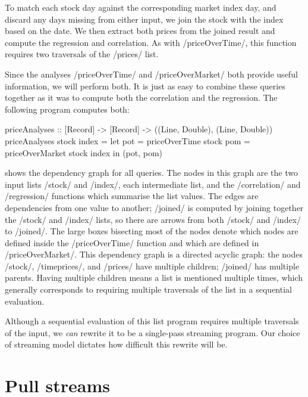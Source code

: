 To match each stock day against the corresponding market index day, and discard any days missing from either input, we join the stock with the index based on the date.
We then extract both prices from the joined result and compute the regression and correlation.
As with \Hs/priceOverTime/, this function requires two traversals of the \Hs/prices/ list.

Since the analyses \Hs/priceOverTime/ and \Hs/priceOverMarket/ both provide useful information, we will perform both.
It is just as easy to combine these queries together as it was to compute both the correlation and the regression.
The following program computes both:

\newpage
\begin{haskell}
priceAnalyses :: [Record] -> [Record] -> ((Line, Double), (Line, Double))
priceAnalyses stock index =
  let pot = priceOverTime   stock
      pom = priceOverMarket stock index
  in (pot, pom)
\end{haskell}



 shows the dependency graph for all queries.
The nodes in this graph are the two input lists \Hs/stock/ and \Hs/index/, each intermediate list, and the \Hs/correlation/ and \Hs/regression/ functions which summarise the list values.
The edges are dependencies from one value to another; \Hs/joined/ is computed by joining together the \Hs/stock/ and \Hs/index/ lists, so there are arrows from both \Hs/stock/ and \Hs/index/ to \Hs/joined/.
The large boxes bisecting most of the nodes denote which nodes are defined inside the \Hs/priceOverTime/ function and which are defined in \Hs/priceOverMarket/.
This dependency graph is a directed acyclic graph: the nodes \Hs/stock/, \Hs/timeprices/, and \Hs/prices/ have multiple children; \Hs/joined/ has multiple parents.
Having multiple children means a list is mentioned multiple times, which generally corresponds to requiring multiple traversals of the list in a sequential evaluation.

Although a sequential evaluation of this list program requires multiple traversals of the input, we \emph{can} rewrite it to be a single-pass streaming program.
Our choice of streaming model dictates how difficult this rewrite will be.

\section{Pull streams}
\label{taxonomy/pull}

